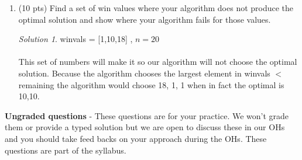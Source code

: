\documentclass[12pt]{article}
\theoremstyle{remark}
\newtheorem*{solution}{Solution}
\begin{document}
\begin{enumerate}
\begin{enumerate}
\\ \\ 
\underline{Proof:} \\ Base Case: $n = 0$ when the projected wins is 0, the while loop never executes, and the algorithm returns 0 players which is the same as the optimal solution, and thus the base case holds. \\ \\
Inductive Hypothesis: Assume that at the $i^{th}$ iteration, remaining is equal to zero. \\ \\
Inductive Step: If remaining is equal to zero at the $i^{th}$ iteration, then that means that at the $i -1$ iteration, remaining will be equal to some winvals[i]. Per the algorithm, if remaining equals any of the elements in the array, then on the next iteration, remaining will be equal to zero. However, if remaining is in between two numbers in winvals, the for loop will check to see if winvals[i] $>$ remaining, and if so, then it will subtract winvals[i-1] which is the next largest element in the list that is less than remaining. This will result in the largest possible amount being subtracted off of remaining at each iteration. This is the same solution as the optimal, thus the algorithm is optimal.
\pagebreak

\item (10 pts) Find a set of win values where your algorithm does not produce the optimal solution and show where your algorithm fails for those values. 
\begin{solution}
winvals = [1,10,18] , $n = 20$ \\ \\
This set of numbers will make it so our algorithm will not choose the optimal solution. Because the algorithm chooses the largest element in winvals $<$ remaining the algorithm would choose 18, 1, 1 when in fact the optimal is 10,10.
\end{solution}

    \end{enumerate}

\end{enumerate}

\pagebreak
\textbf{Ungraded questions} - These questions are for your practice. We won't grade them or provide a typed solution but we are open to discuss these in our OHs and you should take feed backs on your approach during the OHs. These questions are part of the syllabus. 
\end{document}
